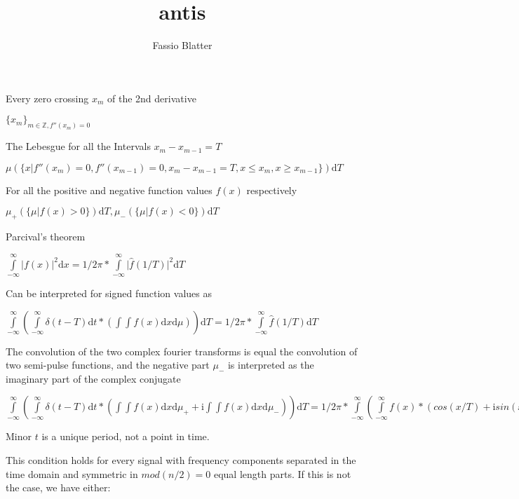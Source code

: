 \documentclass{article}
\renewcommand{\baselinestretch}{2}
\begin{document}
\title{antis}
\author{Fassio Blatter}

\maketitle


\renewcommand{\baselinestretch}{2}

Every zero crossing $x_{m}$ of the 2nd derivative

$\{x_{m}\}_{m \in \mathbb{Z} , f''(x_{m})=0}$

The Lebesgue for all the Intervals $x_{m}-x_{m-1}=T$

$\mu(\{x \vert f''(x_{m})=0, f''(x_{m-1})=0, x_{m}-x_{m-1}=T, x \le x_{m}, x \ge x_{m-1}\}) \mathrm{d} T$

For all the positive and negative function values $f(x)$ respectively

$\mu_{+}(\{{\mu \vert f(x) > 0}\}) \mathrm{d} T, \mu_{-}(\{{\mu \vert f(x) < 0}\})\mathrm{d} T$

Parcival's theorem

$\int\limits_{-\infty}^{\infty} \vert f(x) \vert ^2 \mathrm{d} x = 1/2\pi * \int\limits_{-\infty}^{\infty} \vert \hat{f}(1/T) \vert ^2  \mathrm{d} T$

Can be interpreted for signed function values as

$\int\limits_{-\infty}^{\infty} (\int\limits_{-\infty}^{\infty} \delta (t - T) \mathrm{d} t * (\int\int f(x) \mathrm{d} x \mathrm{d} \mu) )\mathrm{d} T = 1/2\pi * \int\limits_{-\infty}^{\infty} \hat{f}(1/T) \mathrm{d} T$

The convolution of the two complex fourier transforms is equal the convolution of two semi-pulse functions, and the negative part $\mu_{-}$ is interpreted as the imaginary part of the complex conjugate

$\int\limits_{-\infty}^{\infty}(\int\limits_{-\infty}^{\infty} \delta (t - T) \mathrm{d} t * (\int \int f(x) \mathrm{d} x \mathrm{d} \mu_{+} + \mathrm{i} \int \int f(x) \mathrm{d} x \mathrm{d} \mu_{-}))  \mathrm{d} T = 1/2\pi * \int\limits_{-\infty}^{\infty} ( \int\limits_{-\infty}^{\infty}  f(x) * (cos(x/T)+\mathrm{i} sin(x/T)) \mathrm{d} x ) \mathrm{d} T$

Minor $t$ is a unique period, not a point in time.

\renewcommand{\baselinestretch}{1}

This condition holds for every signal with frequency components separated in the time domain and symmetric in $mod(n/2)=0$ equal length parts. If this is not the case, we have either:
\end{document}
